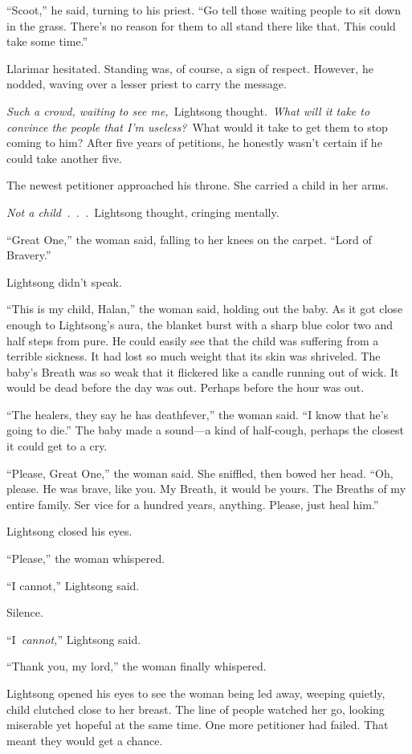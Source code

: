 “Scoot,” he said, turning to his priest. “Go tell those waiting people to sit down in the grass. There’s no reason for them to all stand there like that. This could take some time.”

Llarimar hesitated. Standing was, of course, a sign of respect. However, he nodded, waving over a lesser priest to carry the message.

\textit{Such a crowd, waiting to see me,}~Lightsong thought.~\textit{What will it take to convince the people that I’m useless?}~What would it take to get them to stop coming to him? After five years of petitions, he honestly wasn’t certain if he could take another five.

The newest petitioner approached his throne. She carried a child in her arms.

\textit{Not a child~.~.~.}~Lightsong thought, cringing mentally.

“Great One,” the woman said, falling to her knees on the carpet. “Lord of Bravery.”

Lightsong didn’t speak.

“This is my child, Halan,” the woman said, holding out the baby. As it got close enough to Lightsong’s aura, the blanket burst with a sharp blue color two and half steps from pure. He could easily see that the child was suffering from a terrible sickness. It had lost so much weight that its skin was shriveled. The baby’s Breath was so weak that it flickered like a candle running out of wick. It would be dead before the day was out. Perhaps before the hour was out.

“The healers, they say he has deathfever,” the woman said. “I know that he’s going to die.” The baby made a sound—a kind of half-cough, perhaps the closest it could get to a cry.

“Please, Great One,” the woman said. She sniffled, then bowed her head. “Oh, please. He was brave, like you. My Breath, it would be yours. The Breaths of my entire family. Ser vice for a hundred years, anything. Please, just heal him.”

Lightsong closed his eyes.

“Please,” the woman whispered.

“I cannot,” Lightsong said.

Silence.

“I~\textit{cannot,}” Lightsong said.

“Thank you, my lord,” the woman finally whispered.

Lightsong opened his eyes to see the woman being led away, weeping quietly, child clutched close to her breast. The line of people watched her go, looking miserable yet hopeful at the same time. One more petitioner had failed. That meant they would get a chance.


